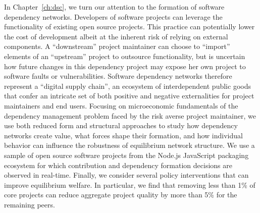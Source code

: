 In Chapter~\ref{ch:dsc}, we turn our attention to the formation of software
dependency networks.  Developers of software projects can leverage the
functionality of existing open source projects.  This practice can potentially
lower the cost of development albeit at the inherent risk of relying on external
components. A ``downstream'' project maintainer can choose to ``import''
elements of an ``upstream'' project to outsource functionality, but is uncertain
how future changes in this dependency project may expose her own project to
software faults or vulnerabilities. Software dependency networks therefore
represent a ``digital supply chain'', an ecosystem of interdependent public
goods that confer an intricate set of both positive and negative externalities
for project maintainers and end users.  Focusing on microeconomic fundamentals
of the dependency management problem faced by the risk averse project
maintainer, we use both reduced form and structural approaches to study how
dependency networks create value, what forces shape their formation, and how
individual behavior can influence the robustness of equilibrium network
structure.  We use a sample of open source software projects from the Node.js
JavaScript packaging ecosystem for which contribution and dependency formation
decisions are observed in real-time. Finally, we consider several policy
interventions that can improve equilibrium welfare.  In particular, we find that
removing less than 1\% of core projects can reduce aggregate project quality by
more than 5\% for the remaining peers.

